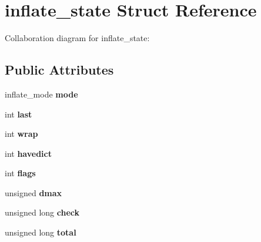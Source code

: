 \hypertarget{structinflate__state}{\section{inflate\+\_\+state Struct Reference}
\label{structinflate__state}
}


Collaboration diagram for inflate\+\_\+state\+:
\subsection*{Public Attributes}
\begin{DoxyCompactItemize}
\item 
\hypertarget{structinflate__state_a9c7906fee7eeeb450b13576531ca639d}{inflate\+\_\+mode {\bfseries mode}}\label{structinflate__state_a9c7906fee7eeeb450b13576531ca639d}

\item 
\hypertarget{structinflate__state_ab3cbcd2c5ff3b0b8b34ef402a13afdf7}{int {\bfseries last}}\label{structinflate__state_ab3cbcd2c5ff3b0b8b34ef402a13afdf7}

\item 
\hypertarget{structinflate__state_a990d157b5c0d4ba178c3361de9ce6561}{int {\bfseries wrap}}\label{structinflate__state_a990d157b5c0d4ba178c3361de9ce6561}

\item 
\hypertarget{structinflate__state_a2eb1cd634ed6baade952ffa5938ebcdc}{int {\bfseries havedict}}\label{structinflate__state_a2eb1cd634ed6baade952ffa5938ebcdc}

\item 
\hypertarget{structinflate__state_a9dcf6151443750d75b2283d0a3e62c39}{int {\bfseries flags}}\label{structinflate__state_a9dcf6151443750d75b2283d0a3e62c39}

\item 
\hypertarget{structinflate__state_ae3d433011714e673b22e82156acc4416}{unsigned {\bfseries dmax}}\label{structinflate__state_ae3d433011714e673b22e82156acc4416}

\item 
\hypertarget{structinflate__state_ae597e4f5c37b9f7881015384bf826371}{unsigned long {\bfseries check}}\label{structinflate__state_ae597e4f5c37b9f7881015384bf826371}

\item 
\hypertarget{structinflate__state_af9d1071eb75b1ee37a151ccec8dfee95}{unsigned long {\bfseries total}}\label{structinflate__state_af9d1071eb75b1ee37a151ccec8dfee95}


\end{DoxyCompactItemize}
